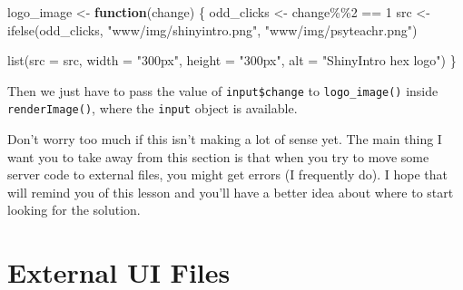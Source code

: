 \documentclass[
]{book}
\newenvironment{Shaded}{\begin{snugshade}}{\end{snugshade}}
\newcommand{\AttributeTok}[1]{\textcolor[rgb]{0.77,0.63,0.00}{#1}}
\newcommand{\ConstantTok}[1]{\textcolor[rgb]{0.00,0.00,0.00}{#1}}
\newcommand{\ControlFlowTok}[1]{\textcolor[rgb]{0.13,0.29,0.53}{\textbf{#1}}}
\newcommand{\DecValTok}[1]{\textcolor[rgb]{0.00,0.00,0.81}{#1}}
\newcommand{\FunctionTok}[1]{\textcolor[rgb]{0.00,0.00,0.00}{#1}}
\newcommand{\NormalTok}[1]{#1}
\newcommand{\OtherTok}[1]{\textcolor[rgb]{0.56,0.35,0.01}{#1}}
\newcommand{\SpecialCharTok}[1]{\textcolor[rgb]{0.00,0.00,0.00}{#1}}
\newcommand{\StringTok}[1]{\textcolor[rgb]{0.31,0.60,0.02}{#1}}
\begin{document}
\begin{Shaded}
\begin{Highlighting}[]
\NormalTok{logo\_image }\OtherTok{\textless{}{-}} \ControlFlowTok{function}\NormalTok{(change) \{}
\NormalTok{  odd\_clicks }\OtherTok{\textless{}{-}}\NormalTok{ change}\SpecialCharTok{\%\%}\DecValTok{2} \SpecialCharTok{==} \DecValTok{1}
\NormalTok{  src }\OtherTok{\textless{}{-}} \FunctionTok{ifelse}\NormalTok{(odd\_clicks, }
                \StringTok{"www/img/shinyintro.png"}\NormalTok{, }
                \StringTok{"www/img/psyteachr.png"}\NormalTok{)}
  
  \FunctionTok{list}\NormalTok{(}\AttributeTok{src =}\NormalTok{ src,}
       \AttributeTok{width =} \StringTok{"300px"}\NormalTok{,}
       \AttributeTok{height =} \StringTok{"300px"}\NormalTok{,}
       \AttributeTok{alt =} \StringTok{"ShinyIntro hex logo"}\NormalTok{)}
\NormalTok{\}}
\end{Highlighting}
\end{Shaded}

Then we just have to pass the value of \texttt{input\$change} to \texttt{logo\_image()} inside \texttt{renderImage()}, where the \texttt{input} object is available.

\begin{Shaded}
\end{Shaded}

Don't worry too much if this isn't making a lot of sense yet. The main thing I want you to take away from this section is that when you try to move some server code to external files, you might get errors (I frequently do). I hope that will remind you of this lesson and you'll have a better idea about where to start looking for the solution.

\hypertarget{external-ui-files}{%
\section{External UI Files}\label{external-ui-files}}
\end{document}
